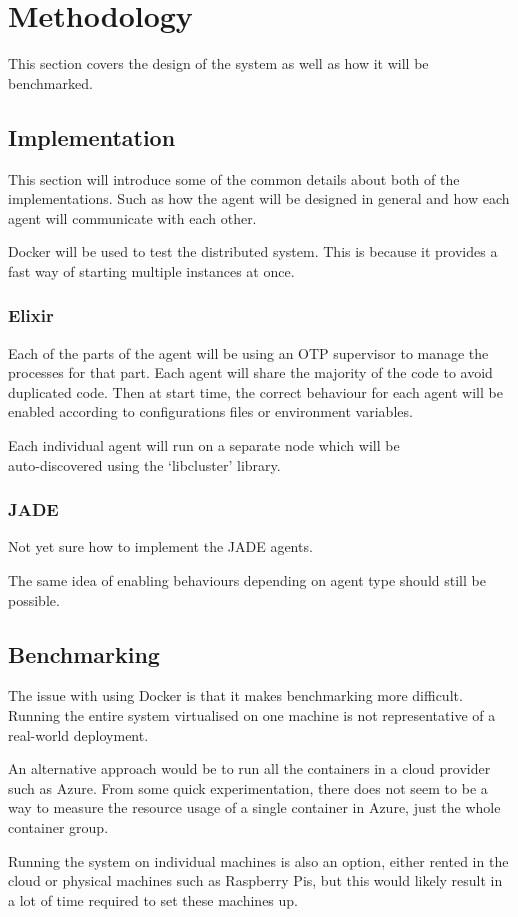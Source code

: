 \section{Methodology}

This section covers the design of the system as well as how it will be benchmarked.

\subsection{Implementation}

This section will introduce some of the common details about both of the implementations.
Such as how the agent will be designed in general and how each agent will communicate with each other.

Docker will be used to test the distributed system.
This is because it provides a fast way of starting multiple instances at once.

\subsubsection{Elixir}

Each of the parts of the agent will be using an OTP supervisor to manage the processes for that part.
Each agent will share the majority of the code to avoid duplicated code.
Then at start time, the correct behaviour for each agent will be enabled according to configurations files or environment variables.

Each individual agent will run on a separate node which will be\\auto-discovered using the `libcluster' library.

\subsubsection{JADE}

Not yet sure how to implement the JADE agents.

The same idea of enabling behaviours depending on agent type should still be possible.

\subsection{Benchmarking}

The issue with using Docker is that it makes benchmarking more difficult.
Running the entire system virtualised on one machine is not representative of a real-world deployment.

An alternative approach would be to run all the containers in a cloud provider such as Azure.
From some quick experimentation, there does not seem to be a way to measure the resource usage of a single container in Azure, just the whole container group.

Running the system on individual machines is also an option, either rented in the cloud or physical machines such as Raspberry Pis, but this would likely result in a lot of time required to set these machines up.
